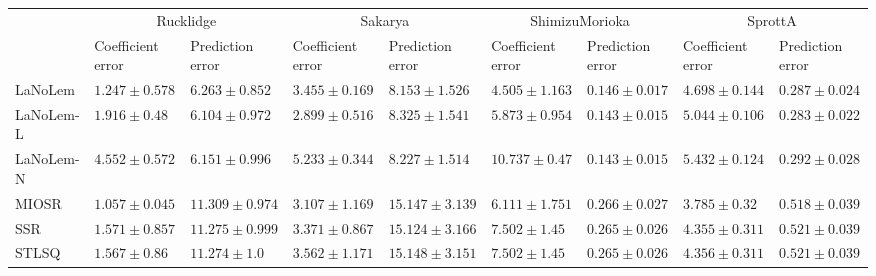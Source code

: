 \begin{table*}
{\begin{tabular}{lllllllll}
 & \multicolumn{2}{c}{Rucklidge} & \multicolumn{2}{c}{Sakarya} & \multicolumn{2}{c}{ShimizuMorioka} & \multicolumn{2}{c}{SprottA} \\
 & Coefficient error & Prediction error & Coefficient error & Prediction error & Coefficient error & Prediction error & Coefficient error & Prediction error \\
\midrule
LaNoLem & $1.247\pm 0.578$ & $6.263\pm 0.852$ & $3.455\pm 0.169$ & $\mathbf{8.153}\pm 1.526$ & $\mathbf{4.505}\pm 1.163$ & $0.146\pm 0.017$ & $4.698\pm 0.144$ & $0.287\pm 0.024$ \\
LaNoLem-L & $1.916\pm 0.48$ & $\mathbf{6.104}\pm 0.972$ & $\mathbf{2.899}\pm 0.516$ & $8.325\pm 1.541$ & $5.873\pm 0.954$ & $\mathbf{0.143}\pm 0.015$ & $5.044\pm 0.106$ & $\mathbf{0.283}\pm 0.022$ \\
LaNoLem-N & $4.552\pm 0.572$ & $6.151\pm 0.996$ & $5.233\pm 0.344$ & $8.227\pm 1.514$ & $10.737\pm 0.47$ & $0.143\pm 0.015$ & $5.432\pm 0.124$ & $0.292\pm 0.028$ \\
MIOSR & $\mathbf{1.057}\pm 0.045$ & $11.309\pm 0.974$ & $3.107\pm 1.169$ & $15.147\pm 3.139$ & $6.111\pm 1.751$ & $0.266\pm 0.027$ & $\mathbf{3.785}\pm 0.32$ & $0.518\pm 0.039$ \\
SSR & $1.571\pm 0.857$ & $11.275\pm 0.999$ & $3.371\pm 0.867$ & $15.124\pm 3.166$ & $7.502\pm 1.45$ & $0.265\pm 0.026$ & $4.355\pm 0.311$ & $0.521\pm 0.039$ \\
STLSQ & $1.567\pm 0.86$ & $11.274\pm 1.0$ & $3.562\pm 1.171$ & $15.148\pm 3.151$ & $7.502\pm 1.45$ & $0.265\pm 0.026$ & $4.356\pm 0.311$ & $0.521\pm 0.039$ \\

\midrule


\end{tabular}}
\end{table*}
